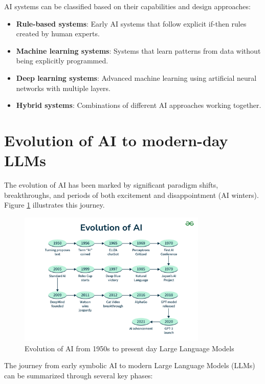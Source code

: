 \documentclass[11pt,a4paper]{report}
\begin{document}
AI systems can be classified based on their capabilities and design approaches:
\begin{itemize}
    \item \textbf{Rule-based systems}: Early AI systems that follow explicit if-then rules created by human experts.
    \item \textbf{Machine learning systems}: Systems that learn patterns from data without being explicitly programmed.
    \item \textbf{Deep learning systems}: Advanced machine learning using artificial neural networks with multiple layers.
    \item \textbf{Hybrid systems}: Combinations of different AI approaches working together.
\end{itemize}

\section{Evolution of AI to modern-day LLMs}
The evolution of AI has been marked by significant paradigm shifts, breakthroughs, and periods of both excitement and disappointment (AI winters). Figure \ref{fig:ai-evolution} illustrates this journey.

\begin{figure}[ht]
    \centering
    \includegraphics[width=0.8\textwidth]{ai_evolution_timeline.png}
    \caption{Evolution of AI from 1950s to present day Large Language Models}
    \label{fig:ai-evolution}
\end{figure}

The journey from early symbolic AI to modern Large Language Models (LLMs) can be summarized through several key phases:
\end{document}
